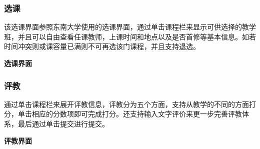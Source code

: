 \documentclass{article}
\begin{document}
\subsubsection{选课}
该选课界面参照东南大学使用的选课界面，通过单击课程栏来显示可供选择的教学班，并且可以自由查看任课教师，上课时间和地点以及是否首修等基本信息。如若时间冲突则或课容量已满则不可再选该门课程，并且支持退选。
\begin{center}
\textbf{选课界面}
\end{center}

\subsubsection{评教}
通过单击课程栏来展开评教信息，评教分为五个方面，支持从教学的不同的方面打分，单击相应的分数项即可完成打分。还支持输入文字评价来更一步完善评教体系，最后通过单击提交进行提交。
\begin{center}
\textbf{评教界面}
\end{center}
\end{document}
